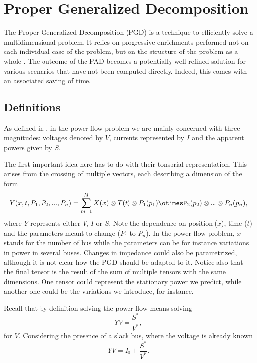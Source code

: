 \documentclass{article}
\begin{document}
\section{Proper Generalized Decomposition}
The Proper Generalized Decomposition (PGD) is a technique to efficiently solve  a multidimensional problem. It relies on progressive enrichments performed not on each individual case of the problem, but on the structure of the problem as a whole \cite{chinesta2010recent}. The outcome of the PAD becomes a potentially well-refined solution for various scenarios that have not been computed directly. Indeed, this comes with an associated saving of time. 
\subsection{Definitions}
As defined in \cite{garcia2016reduced}, in the power flow problem we are mainly concerned with three magnitudes: voltages denoted by $V$, currents represented by $I$ and the apparent powers given by $S$. 

The first important idea here has to do with their tonsorial representation. This arises from the crossing of multiple vectors, each describing a dimension of the form \[
	Y(x,t,P_1,P_2,...,P_n) = \sum_{m=1}^{M}X(x)\otimes T(t) \otimes P_1(p_1)\otimesP_2(p_2)\otimes...\otimes P_n(p_n)
,\] 
where $Y$ represents either $V$, $I$ or $S$. Note the dependence on position ($x$), time ($t$) and the parameters meant to change ($P_1$ to $P_n$). In the power flow problem, $x$ stands for the number of bus while the parameters can be for instance variations in power in several buses. Changes in impedance could also be parametrized, although it is not clear how the PGD should be adapted to it. Notice also that the final tensor is the result of the sum of multiple tensors with the same dimensions. One tensor could represent the stationary power we predict, while another one could be the variations we introduce, for instance.

Recall that by definition solving the power flow means solving \[
YV=\frac{S^*}{V^*}
,\] 
for $V$. Considering the presence of a slack bus, where the voltage is already known \[
YV = I_0 + \frac{S^*}{V^*}
.\] 













\newpage
\printbibliography
\end{document}
